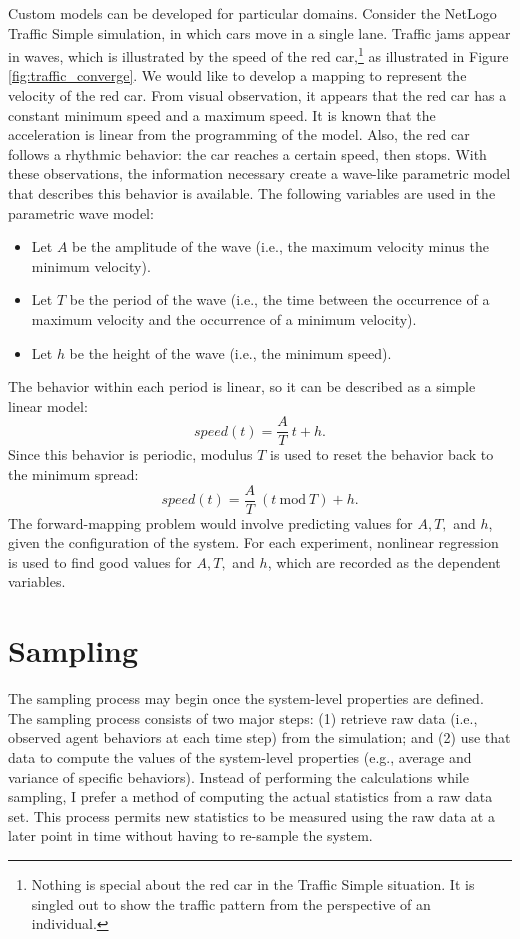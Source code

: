 Custom models can be developed for particular domains.
Consider the NetLogo Traffic Simple simulation, in which cars move in a single lane.
Traffic jams appear in waves, which is illustrated by the speed of the red car,\footnote{Nothing is special about the red car in the Traffic Simple situation. It is singled out to show the traffic pattern from the perspective of an individual.} as illustrated in Figure \ref{fig:traffic_converge}.
We would like to develop a mapping to represent the velocity of the red car.
From visual observation, it appears that the red car has a constant minimum speed and a maximum speed.
It is known that the acceleration is linear from the programming of the model.
Also, the red car follows a rhythmic behavior: the car reaches a certain speed, then stops.
With these observations, the information necessary create a wave-like parametric model that describes this behavior is available.
 The following variables are used in the parametric wave model:
\begin{itemize}
  \item Let $A$ be the amplitude of the wave (i.e., the maximum velocity minus the minimum velocity).
  \item Let $T$ be the period of the wave (i.e., the time between the occurrence of a maximum velocity and the occurrence of a minimum velocity).
  \item Let $h$ be the height of the wave (i.e., the minimum speed).
\end{itemize}
The behavior within each period is linear, so it can be described as a simple linear model:
   \[speed(t) = \displaystyle \frac{A}{T} ~{} t + h.\]
Since this behavior is periodic, modulus $T$ is used to reset the behavior back to the minimum spread:
   \[speed(t) = \displaystyle \frac{A}{T} ~{} (t~{}\mathrm{mod}~{} T) + h. \]
The forward-mapping problem would involve predicting values for $A, T,$ and $h$, given the configuration of the system.
For each experiment, nonlinear regression is used to find good values for $A, T,$ and $h$, which are recorded as the dependent variables.



\section{Sampling}
The sampling process may begin once the system-level properties are defined.
The \fw sampling process consists of two major steps:
(1) retrieve raw data (i.e., observed agent behaviors at each time step) from the simulation; and (2) use that data to compute the values of the system-level properties (e.g., average and variance of specific behaviors).
Instead of performing the calculations while sampling, I prefer a method of computing the actual statistics from a raw data set.
This process permits new statistics to be measured using the raw data at a later point in time without having to re-sample the system.

